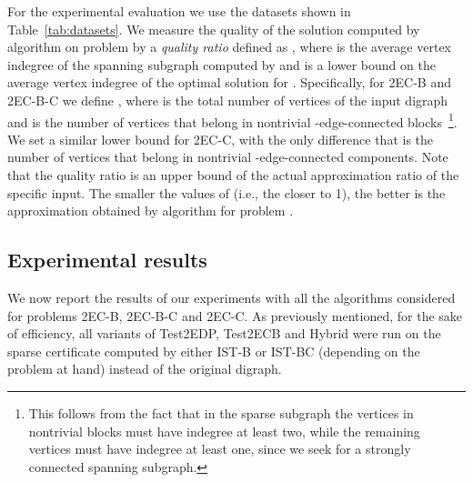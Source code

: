 \documentclass[11pt]{article}
\begin{document}
For the experimental evaluation we use the datasets shown in
Table~\ref{tab:datasets}. We measure the quality of the solution
computed by algorithm  on problem  by a \emph{quality
ratio} defined as , where
 is the average vertex indegree of the spanning
subgraph computed by  and  is
a lower bound on the average vertex indegree of the optimal
solution for .
Specifically, for \textsf{2EC-B} and
\textsf{2EC-B-C} we define
, where  is the total number of vertices of the input digraph and  is the number of vertices that belong in nontrivial -edge-connected blocks~\footnote{This follows from the fact that in the sparse subgraph the  vertices in nontrivial blocks must have indegree at least two, while the remaining  vertices must have indegree at least one, since we seek for a strongly connected spanning subgraph.}.
We set a similar lower bound  for \textsf{2EC-C}, with the only difference that  is the number of vertices that belong in nontrivial -edge-connected components.
Note that the quality ratio is an upper bound of the actual approximation ratio of the specific input. 
The smaller the values of   (i.e., the closer to 1), the better is the approximation obtained by algorithm  for problem .


\subsection{Experimental results}
\label{sec:results}
We now report the results of our experiments with all the algorithms
considered for problems \textsf{2EC-B}, \textsf{2EC-B-C}  and \textsf{2EC-C}. As previously mentioned, for the sake of efficiency, all variants of \textsf{Test2EDP}, \textsf{Test2ECB} and \textsf{Hybrid}
were run on the sparse certificate computed by either \textsf{IST-B} or \textsf{IST-BC}
(depending on the problem at hand) instead of the original digraph.
\end{document}
